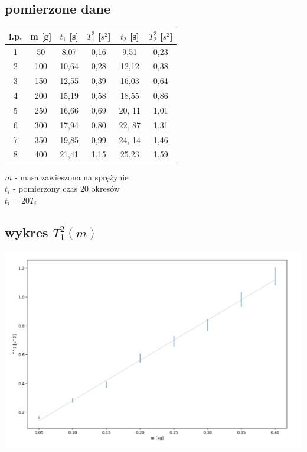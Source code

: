 \documentclass{article}
\begin{document}
\subsection{pomierzone dane}
\begin{center}
\begin{tabular}{ c | c | c| c |c|c}
l.p.  & m [g] & $t_1$ [s]  & $T_1^2$ [$s^2$] & $t_2$ [s] & $T_2^2$ [$s^2$]\\
\hline
 1   & 50 & 8,07 & 0,16 & 9,51 & 0,23\\ 
 2   & 100 & 10,64 & 0,28 & 12,12 & 0,38\\ 
 3   & 150 & 12,55 & 0,39 & 16,03 & 0,64\\ 
 4  & 200 & 15,19 &0,58& 18,55 & 0,86\\
 5  & 250 & 16,66 & 0,69 & 20, 11 & 1,01\\
 6  & 300 & 17,94 & 0,80 & 22, 87 & 1,31\\
 7  & 350 & 19,85 & 0,99 & 24, 14 & 1,46\\
 8  & 400 & 21,41 & 1,15& 25,23 & 1,59\\

\end{tabular}
\end{center}
$m$ - masa zawieszona na sprężynie \\
$t_i$ - pomierzony czas 20 okresów \\
$t_i = 20T_i$

\subsection{wykres $T_1^2(m)$}

\includegraphics[width=15cm]{m7_2}\\
\end{document}

